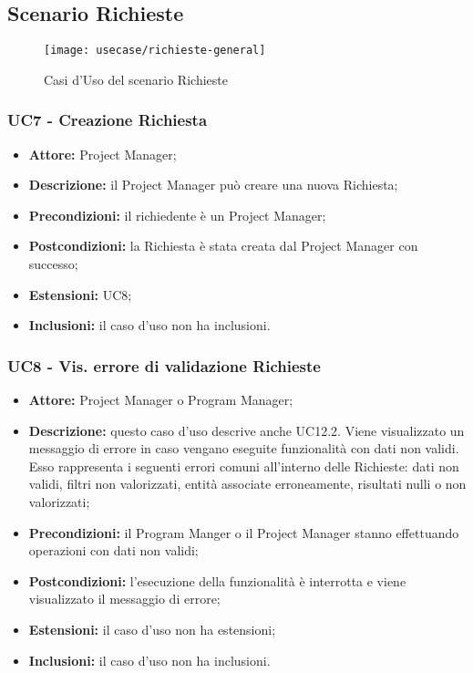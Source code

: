 \subsection{Scenario Richieste}
\begin{figure}[H] 
    \centering 
    \texttt{[image: usecase/richieste-general]} 
    \caption{Casi d'Uso del scenario Richieste}
\end{figure}

\subsubsection*{UC7 - Creazione Richiesta}
\begin{itemize}[label=$\circ$]
\item \textbf{Attore:} Project Manager;
\item \textbf{Descrizione:} il Project Manager può creare una nuova Richiesta;
\item \textbf{Precondizioni:} il richiedente è un Project Manager;
\item \textbf{Postcondizioni:} la Richiesta è stata creata dal Project Manager con successo;
\item \textbf{Estensioni:} UC8;
\item \textbf{Inclusioni:} il caso d'uso non ha inclusioni.
\end{itemize}

\subsubsection*{UC8 - Vis. errore di validazione Richieste}
\begin{itemize}[label=$\circ$]
\item \textbf{Attore:} Project Manager o Program Manager;
\item \textbf{Descrizione:}  questo caso d'uso descrive anche UC12.2. Viene visualizzato un messaggio di errore in caso vengano eseguite funzionalità con dati non validi. Esso rappresenta i seguenti errori comuni all'interno delle Richieste: dati non validi, filtri non valorizzati, entità associate erroneamente, risultati nulli o non valorizzati;
\item \textbf{Precondizioni:} il Program Manger o il Project Manager stanno effettuando operazioni con dati non validi;
\item \textbf{Postcondizioni:} l'esecuzione della funzionalità è interrotta e viene visualizzato il messaggio di errore;
\item \textbf{Estensioni:} il caso d'uso non ha estensioni;
\item \textbf{Inclusioni:} il caso d'uso non ha inclusioni.
\end{itemize}

